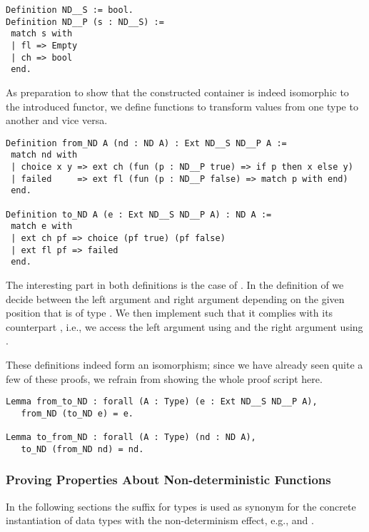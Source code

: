 \begin{verbatim}
Definition ND__S := bool.
Definition ND__P (s : ND__S) :=
 match s with
 | fl => Empty
 | ch => bool
 end.
\end{verbatim}

As preparation to show that the constructed container is indeed isomorphic to the introduced functor, we define functions to transform values from one type to another and vice versa.

\begin{verbatim}
Definition from_ND A (nd : ND A) : Ext ND__S ND__P A :=
 match nd with
 | choice x y => ext ch (fun (p : ND__P true) => if p then x else y)
 | failed     => ext fl (fun (p : ND__P false) => match p with end)
 end.

Definition to_ND A (e : Ext ND__S ND__P A) : ND A :=
 match e with
 | ext ch pf => choice (pf true) (pf false)
 | ext fl pf => failed
 end.
\end{verbatim}

The interesting part in both definitions is the case of .
In the definition of  we decide between the left argument  and right argument  depending on the given position  that is of type .
We then implement  such that it complies with its counterpart , i.e., we access the left argument using  and the right argument using .

These definitions indeed form an isomorphism; since we have already seen quite a few of these proofs, we refrain from showing the whole proof script here.

\begin{verbatim}
Lemma from_to_ND : forall (A : Type) (e : Ext ND__S ND__P A),
   from_ND (to_ND e) = e.

Lemma to_from_ND : forall (A : Type) (nd : ND A),
   to_ND (from_ND nd) = nd.
\end{verbatim}

\subsubsection{Proving Properties About Non-deterministic Functions}

In the following sections the suffix  for types is used as synonym for the concrete instantiation of data types with the non-determinism effect, e.g.,  and .

